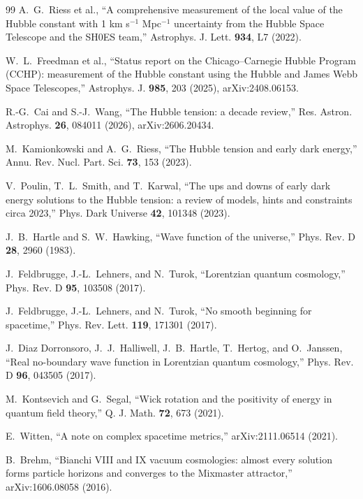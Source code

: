 \documentclass[11pt,letterpaper]{article}
\begin{document}
\begin{thebibliography}{99}
 A.~G.~Riess et al., ``A comprehensive measurement of the local value of the Hubble constant with 1 km s$^{-1}$ Mpc$^{-1}$ uncertainty from the Hubble Space Telescope and the SH0ES team,'' Astrophys. J. Lett. \textbf{934}, L7 (2022).

 W.~L.~Freedman et al., ``Status report on the Chicago--Carnegie Hubble Program (CCHP): measurement of the Hubble constant using the Hubble and James Webb Space Telescopes,'' Astrophys. J. \textbf{985}, 203 (2025), arXiv:2408.06153.

 R.-G.~Cai and S.-J.~Wang, ``The Hubble tension: a decade review,'' Res. Astron. Astrophys. \textbf{26}, 084011 (2026), arXiv:2606.20434.

 M.~Kamionkowski and A.~G.~Riess, ``The Hubble tension and early dark energy,'' Annu. Rev. Nucl. Part. Sci. \textbf{73}, 153 (2023).

 V.~Poulin, T.~L.~Smith, and T.~Karwal, ``The ups and downs of early dark energy solutions to the Hubble tension: a review of models, hints and constraints circa 2023,'' Phys. Dark Universe \textbf{42}, 101348 (2023).

 J.~B.~Hartle and S.~W.~Hawking, ``Wave function of the universe,'' Phys. Rev. D \textbf{28}, 2960 (1983).

 J.~Feldbrugge, J.-L.~Lehners, and N.~Turok, ``Lorentzian quantum cosmology,'' Phys. Rev. D \textbf{95}, 103508 (2017).

 J.~Feldbrugge, J.-L.~Lehners, and N.~Turok, ``No smooth beginning for spacetime,'' Phys. Rev. Lett. \textbf{119}, 171301 (2017).

 J.~Diaz Dorronsoro, J.~J.~Halliwell, J.~B.~Hartle, T.~Hertog, and O.~Janssen, ``Real no-boundary wave function in Lorentzian quantum cosmology,'' Phys. Rev. D \textbf{96}, 043505 (2017).

 M.~Kontsevich and G.~Segal, ``Wick rotation and the positivity of energy in quantum field theory,'' Q. J. Math. \textbf{72}, 673 (2021).

 E.~Witten, ``A note on complex spacetime metrics,'' arXiv:2111.06514 (2021).

 B.~Brehm, ``Bianchi VIII and IX vacuum cosmologies: almost every solution forms particle horizons and converges to the Mixmaster attractor,'' arXiv:1606.08058 (2016).


\end{thebibliography}
\end{document}
